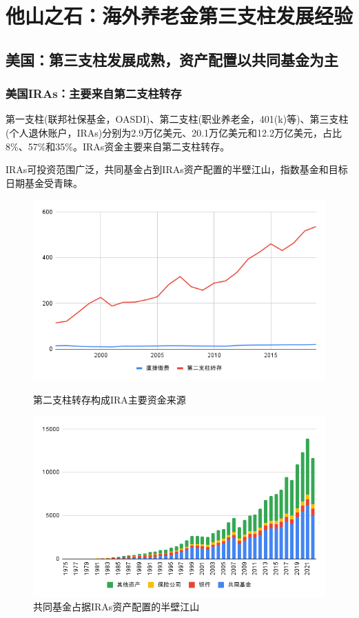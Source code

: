 \documentclass[a4paper,zihao=5]{ctexbeamer}
\begin{document}
\section{他山之石：海外养老金第三支柱发展经验}
\subsection{美国：第三支柱发展成熟，资产配置以共同基金为主}
\begin{frame}
    \frametitle{美国IRAs：主要来自第二支柱转存}

    第一支柱(联邦社保基金，OASDI)、第二支柱(职业养老金，401(k)等)、第三支柱(个人退休账户，IRAs)分别为2.9万亿美元、20.1万亿美元和12.2万亿美元，占比8\%、57\%和35\%。IRAs资金主要来自第二支柱转存。

    IRAs可投资范围广泛，共同基金占到IRAs资产配置的半壁江山，指数基金和目标日期基金受青睐。
    \begin{figure}[H]
        \begin{minipage}{0.48\linewidth}
            \centering
            \includegraphics[width=0.8\linewidth]{img/第二支柱转存构成传统型IRA主要资金来源.png}
            \caption{第二支柱转存构成IRA主要资金来源}
        \end{minipage}
        \begin{minipage}{0.48\linewidth}
            \centering
            \includegraphics[width=\linewidth]{img/共同基金占据IRAs资产配置的半壁江山.png}
            \caption{共同基金占据IRAs资产配置的半壁江山}
        \end{minipage}
    \end{figure}
\end{frame}
\end{document}
